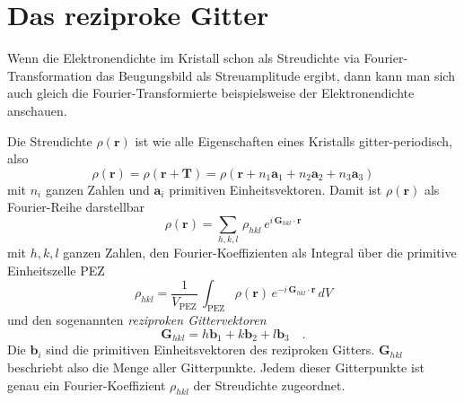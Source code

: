 \section{Das reziproke Gitter}
Wenn die Elektronendichte im Kristall schon als Streudichte via Fourier-Transformation das Beugungsbild als Streuamplitude ergibt, dann kann man sich auch gleich die Fourier-Transformierte beispielsweise der Elektronendichte anschauen.

Die Streudichte $\rho(\mathbf{r})$ ist wie alle Eigenschaften eines Kristalls gitter-periodisch, also 
\begin{equation}
  \rho(\mathbf{r}) = \rho(\mathbf{r} + \mathbf{T}) = \rho(\mathbf{r} + n_1 \mathbf{a}_1 + n_2 \mathbf{a}_2  + n_3 \mathbf{a}_3) 
\end{equation}
mit $n_i$ ganzen Zahlen und $\mathbf{a}_i$ primitiven Einheitsvektoren. Damit ist $\rho(\mathbf{r})$ als Fourier-Reihe darstellbar
\begin{equation}
  \rho(\mathbf{r}) = \sum_{h,k,l} \, \rho_{hkl} \, e^{i \, \mathbf{G}_{hkl} \cdot \mathbf{r}}
\end{equation}
mit $h,k,l$ ganzen Zahlen, den Fourier-Koeffizienten als Integral über die primitive Einheitszelle PEZ
\begin{equation}
\rho_{hkl} = \frac{1}{V_\text{PEZ}} \, \int_\text{PEZ}    \rho(\mathbf{r})\,  e^{-i \, \mathbf{G}_{hkl} \cdot \mathbf{r}} \, dV \label{eq:rezi_rho_hkl}
\end{equation}
und den sogenannten \emph{reziproken Gittervektoren}
\begin{equation}
\mathbf{G}_{hkl} = h \mathbf{b}_1 + k \mathbf{b}_2 + l \mathbf{b}_3 \quad .
\end{equation}
Die $\mathbf{b}_i$ sind die primitiven Einheitsvektoren des reziproken Gitters. $\mathbf{G}_{hkl}$ beschriebt also die Menge aller Gitterpunkte. Jedem dieser Gitterpunkte ist genau ein Fourier-Koeffizient $\rho_{hkl}$ der Streudichte zugeordnet. 

